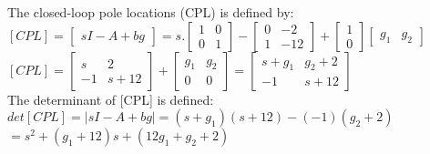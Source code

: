 \documentclass[14pt,a4paper]{article}
\begin{document}
\begin{enumerate}
		The closed-loop pole locations (CPL) is defined by:\\
		$[CPL] = \begin{bmatrix} sI-A+bg \end{bmatrix} = s.\begin{bmatrix}1&0\\0&1 \end{bmatrix} - \begin{bmatrix}0&-2 \\1&-12 \end{bmatrix} +  \begin{bmatrix} 1\\0 \end{bmatrix} \begin{bmatrix} g_1 & g_2 \end{bmatrix}$\\
		$[CPL] = \begin{bmatrix}s&2 \\-1&s+12 \end{bmatrix} + \begin{bmatrix} g_1 & g_2  \\ 0&0 \end{bmatrix} = \begin{bmatrix}s+g_1&g_2+2 \\-1&s+12 \end{bmatrix} $\\
		
		The determinant of [CPL] is defined: \\
		$det[CPL] = |sI-A+bg| = (s+g_1)(s+12) -(-1)(g_2+2)$\\
		\hspace*{4.6cm} $ = s^2 + (g_1 + 12)s + (12g_1+g_2+2)  $ 
		

\end{enumerate}
\end{document}
